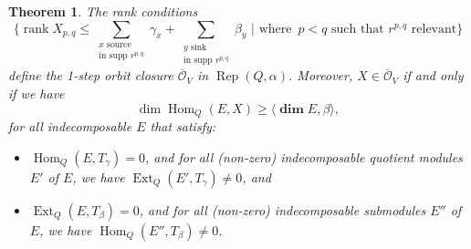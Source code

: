 \documentclass[twoside]{article}
\newcommand{\ds}{\displaystyle\sum}
\newcommand{\orb}{\mathcal{O}}
\newcommand{\ove}{\overline}
\DeclareMathOperator{\Dim}{\mathbf{dim}}
\newcommand{\Hom}{\operatorname{Hom}}
\newcommand{\Ext}{\operatorname{Ext}}
\newcommand{\Rep}{\operatorname{Rep}}
\newcommand{\rank}{\operatorname{rank}}
\newtheorem{theorem}{Theorem}[section]
\theoremstyle{definition}
\begin{document}
\begin{theorem}\label{thm:rank}
The rank conditions 
$$\{\rank X_{p,q}\leq \ds_{\substack{x \text{ source}\\ \text{in supp } r^{p,q}}} \gamma_x +\ds_{\substack{y \text{ sink}\\ \text{in supp } r^{p,q}}} \beta_y\,\, | \text{ where } \, p<q \text{ such that } r^{p,q} \text{ relevant}\}$$
define the 1-step orbit closure $\ove{\orb}_V$ in $\Rep(Q,\alpha)$. Moreover, $X\in \ove{\orb}_V$ if and only if we have
$$\dim \Hom_Q(E,X)\geq \langle \Dim E,\beta\rangle,$$
for all indecomposable $E$ that satisfy: %
\begin{itemize}
\item[$\bullet$] $\Hom_Q(E,T_\gamma)=0$, and for all (non-zero) indecomposable quotient modules $E'$ of $E$, we have $\Ext_Q(E',T_\gamma)\neq 0$, and
\item[$\bullet$] $\Ext_Q(E,T_\beta)=0$, and for all (non-zero) indecomposable submodules $E''$ of $E$, we have $\Hom_Q(E'',T_\beta)\neq 0$.
\end{itemize}
\end{theorem}
\end{document}

